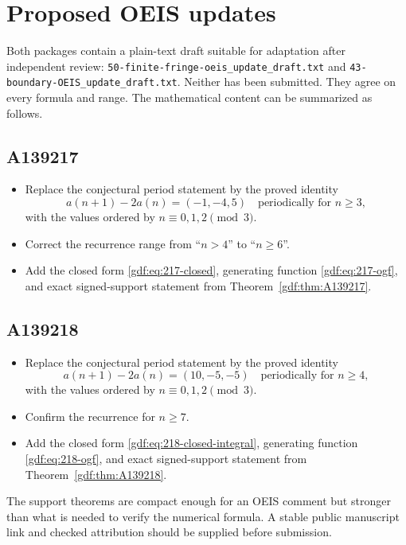 \documentclass[11pt,a4paper]{article}
\numberwithin{equation}{section}
\theoremstyle{definition}
\theoremstyle{remark}
\theoremstyle{plain}
\newcommand{\file}[1]{\nolinkurl{#1}}
\begin{document}
\section{Proposed OEIS updates}\label{gdf:sec:oeis}

Both packages contain a plain-text draft suitable for adaptation after
independent review: \file{50-finite-fringe-oeis_update_draft.txt} and
\file{43-boundary-OEIS_update_draft.txt}.  Neither has been submitted.
They agree on every formula and range.  The mathematical content can be
summarized as follows.

\subsection{A139217}

\begin{itemize}
\item Replace the conjectural period statement by the proved identity
\[
 a(n+1)-2a(n)=(-1,-4,5)\quad\text{periodically for }n\ge3,
\]
with the values ordered by $n\equiv0,1,2\pmod3$.
\item Correct the recurrence range from ``$n>4$'' to ``$n\ge6$''.
\item Add the closed form \eqref{gdf:eq:217-closed}, generating function
\eqref{gdf:eq:217-ogf}, and exact signed-support statement from
Theorem~\ref{gdf:thm:A139217}.
\end{itemize}

\subsection{A139218}

\begin{itemize}
\item Replace the conjectural period statement by the proved identity
\[
 a(n+1)-2a(n)=(10,-5,-5)\quad\text{periodically for }n\ge4,
\]
with the values ordered by $n\equiv0,1,2\pmod3$.
\item Confirm the recurrence for $n\ge7$.
\item Add the closed form \eqref{gdf:eq:218-closed-integral}, generating function
\eqref{gdf:eq:218-ogf}, and exact signed-support statement from
Theorem~\ref{gdf:thm:A139218}.
\end{itemize}

The support theorems are compact enough for an OEIS comment but stronger than
what is needed to verify the numerical formula.  A stable public manuscript
link and checked attribution should be supplied before submission.
\end{document}
